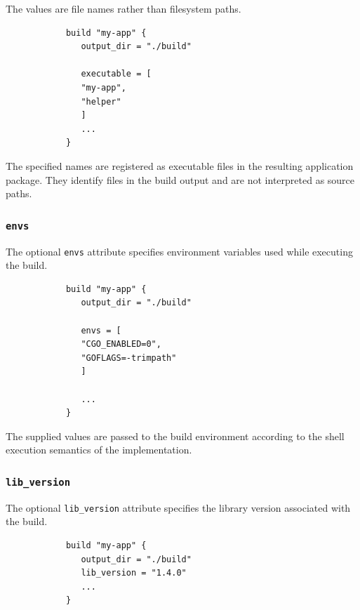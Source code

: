 \documentclass[11pt,a4paper]{article}
\begin{document}
    The values are file names rather than filesystem paths.

    \begin{center}
        \begin{verbatim}
            build "my-app" {
               output_dir = "./build"

               executable = [
               "my-app",
               "helper"
               ]
               ...
            }
        \end{verbatim}
    \end{center}

    The specified names are registered as executable files in the resulting application package.
    They identify files in the build output and are not interpreted as source paths.

    \subsubsection{\texttt{envs}}

    The optional \texttt{envs} attribute specifies environment variables used while executing the build.

    \begin{center}
        \begin{verbatim}
            build "my-app" {
               output_dir = "./build"

               envs = [
               "CGO_ENABLED=0",
               "GOFLAGS=-trimpath"
               ]

               ...
            }
        \end{verbatim}
    \end{center}

    The supplied values are passed to the build environment according to the shell execution semantics of the implementation.

    \subsubsection{\texttt{lib\_version}}

    The optional \texttt{lib\_version} attribute specifies the library version associated with the build.

    \begin{center}
        \begin{verbatim}
            build "my-app" {
               output_dir = "./build"
               lib_version = "1.4.0"
               ...
            }
        \end{verbatim}
    \end{center}
\end{document}

